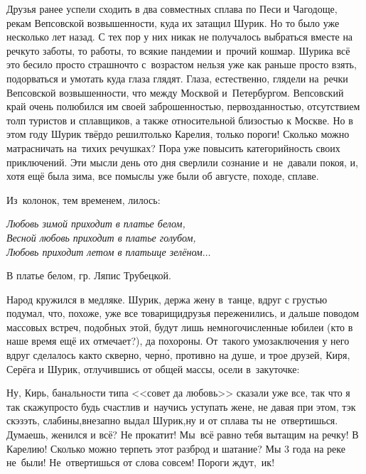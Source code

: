 {Друзья ранее успели сходить в два совместных сплава по Песи и Чагодоще, рекам Вепсовской возвышенности, куда их затащил Шурик. Но то было уже несколько лет назад. С тех пор у них никак не получалось выбраться вместе на речку\mdash то заботы, то работы, то всякие пандемии и~прочий кошмар. Шурика всё это бесило просто страшно\mdash что с~возрастом нельзя уже как раньше просто взять, подорваться и умотать куда глаза глядят. Глаза, естественно, глядели на~речки Вепсовской возвышенности, что между Москвой и~Петербургом. Вепсовский край очень полюбился им своей заброшенностью, первозданностью, отсутствием толп туристов и сплавщиков, а также относительной близостью к Москве. Но в этом году Шурик твёрдо решил\mdash только Карелия, только пороги! Сколько можно матрасничать на~тихих речушках? Пора уже повысить категорийность своих приключений. Эти мысли день ото дня сверлили сознание и~не~давали покоя, и, хотя ещё была зима, все помыслы уже были об августе, походе, сплаве.

Из~колонок, тем временем, лилось:

\vspace{0.08cm}
\noindent\textit{%
	\hspace*{1.4cm}Любовь зимой приходит в платье белом,\\
	\hspace*{1.4cm}Весной любовь приходит в платье голубом,\\
	\hspace*{1.4cm}Любовь приходит летом в платьице зелёном$\ldots$
}

{\raggedleft \scriptsize \mdash В платье белом, гр. Ляпис Трубецкой. \par}

\vspace{0.08cm}

Народ кружился в медляке. Шурик, держа жену в~танце, вдруг с грустью подумал, что, похоже, уже все товарищи\sdash друзья переженились, и дальше поводом массовых встреч, подобных этой, будут лишь немногочисленные юбилеи (кто в наше время ещё их отмечает?), да похороны. От~такого умозаключения у него вдруг сделалось как\sdash то скверно, черн\'{о}, противно на душе, и трое друзей, Киря, Серёга и Шурик, отлучившись от общей массы, осели в~закуточке:

\diagdash Ну, Кирь, банальности типа <<совет да любовь>> сказали уже все, так что я так скажу\mdash просто будь счастлив и~научись уступать жене, не давая при этом, тэк скэзэть, слабины,\mdash внезапно выдал Шурик,\mdash ну и от сплава ты не~отвертишься. Думаешь, женился и всё? Не прокатит! Мы~всё равно тебя вытащим на речку! В Карелию! Сколько можно терпеть этот разброд и шатание? Мы 3 года на реке не~были! Не~отвертишься от слова совсем! Пороги ждут,~ик!

}
